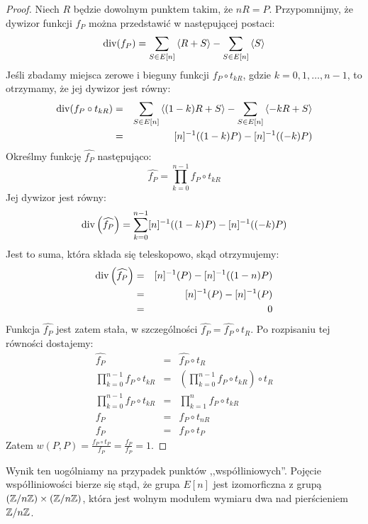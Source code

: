 \begin{proof}
Niech $R$ będzie dowolnym punktem takim, że $nR = P$.
Przypomnijmy, że dywizor funkcji $f_P$
można przedstawić w następującej postaci:
\begin{equation*}
\operatorname{div}(f_P) = \sum_{S \in E[n]} \left\langle R + S\right\rangle - \sum_{S \in E[n]} \left\langle S\right\rangle
\end{equation*}
Jeśli zbadamy miejsca zerowe i bieguny funkcji $f_P \circ t_{kR}$,
gdzie $k = 0, 1, \ldots, n-1$,
to otrzymamy, że jej dywizor jest równy:
\begin{eqnarray*}
\operatorname{div}(f_P \circ t_{kR})
& = & \sum_{S \in E[n]} \left\langle(1-k)R + S\right\rangle - \sum_{S \in E[n]} \left\langle-kR + S\right\rangle \\
& = & [n]^{-1}((1-k)P) - [n]^{-1}((-k)P)
\end{eqnarray*}
Określmy funkcję $\widehat{f_P}$ następująco:
\begin{equation*}
\widehat{f_P} = \prod_{k=0}^{n-1} f_P \circ t_{kR}
\end{equation*}
Jej dywizor jest równy:
\begin{equation*}
\operatorname{div}\left(\widehat{f_P}\right) =
\sum_{k=0}^{n-1} [n]^{-1}((1-k)P) - [n]^{-1}((-k)P)
\end{equation*}
Jest to suma, która składa się teleskopowo, skąd otrzymujemy:
\begin{eqnarray*}
\operatorname{div}\left(\widehat{f_P}\right)
& = & [n]^{-1}(P) - [n]^{-1}((1-n)P) \\
& = & [n]^{-1}(P) - [n]^{-1}(P) \\
& = & 0
\end{eqnarray*}
Funkcja $\widehat{f_P}$ jest zatem stała,
w szczególności $\widehat{f_P} = \widehat{f_P} \circ t_R$.
Po rozpisaniu tej równości dostajemy:
\begin{eqnarray*}
\widehat{f_P}
& = &
\widehat{f_P} \circ t_R
\\
\prod_{k=0}^{n-1} f_P \circ t_{kR}
& = &
\left(\prod_{k=0}^{n-1} f_P \circ t_{kR}\right) \circ t_R
\\
\prod_{k=0}^{n-1} f_P \circ t_{kR}
& = &
\prod_{k=1}^{n} f_P \circ t_{kR}
\\
f_P
& = &
f_P \circ t_{nR}
\\
f_P
& = &
f_P \circ t_P
\end{eqnarray*}
Zatem $w(P,P) = \frac{f_P \circ t_P}{f_P} = \frac{f_P}{f_P} = 1$.
\end{proof}

Wynik ten uogólniamy na przypadek punktów ,,współliniowych''.
Pojęcie współliniowości bierze się stąd,
że grupa $E[n]$ jest izomorficzna z grupą $(\mathbb{Z}/n\mathbb{Z})\times(\mathbb{Z}/n\mathbb{Z})$,
która jest wolnym modułem wymiaru dwa nad pierścieniem $\mathbb{Z}/n\mathbb{Z}$.

